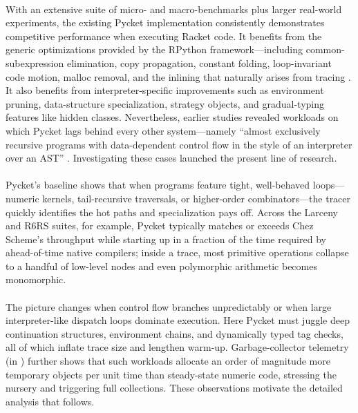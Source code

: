 	\paragraph{}%
		With an extensive suite of micro- and macro-benchmarks plus larger real-world experiments, the existing Pycket implementation consistently demonstrates competitive performance when executing Racket code. It benefits from the generic optimizations provided by the RPython framework—including common-subexpression elimination, copy propagation, constant folding, loop-invariant code motion, malloc removal, and the inlining that naturally arises from tracing \cite{loop-aware:12,hotpath:06,malloc-removal:11}. It also benefits from interpreter-specific improvements such as environment pruning, data-structure specialization, strategy objects, and gradual-typing features like hidden classes. Nevertheless, earlier studies revealed workloads on which Pycket lags behind every other system—namely “almost exclusively recursive programs with data-dependent control flow in the style of an interpreter over an AST” \cite{pycketmain,pycketmain2}. Investigating these cases launched the present line of research.

	\paragraph{}%
		Pycket's baseline shows that when programs feature tight, well-behaved loops—numeric kernels, tail-recursive traversals, or higher-order combinators—the tracer quickly identifies the hot paths and specialization pays off. Across the Larceny and R6RS suites, for example, Pycket typically matches or exceeds Chez Scheme's throughput while starting up in a fraction of the time required by ahead-of-time native compilers; inside a trace, most primitive operations collapse to a handful of low-level nodes and even polymorphic arithmetic becomes monomorphic.

	\paragraph{}%
		The picture changes when control flow branches unpredictably or when large interpreter-like dispatch loops dominate execution. Here Pycket must juggle deep continuation structures, environment chains, and dynamically typed tag checks, all of which inflate trace size and lengthen warm-up. Garbage-collector telemetry (in ) further shows that such workloads allocate an order of magnitude more temporary objects per unit time than steady-state numeric code, stressing the nursery and triggering full collections. These observations motivate the detailed analysis that follows.

